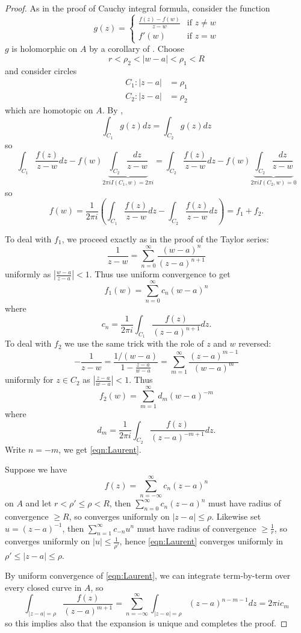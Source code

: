 \documentclass[a4paper]{article}
\begin{document}
\begin{proof}
  As in the proof of Cauchy integral formula, consider the function
  \[
    g(z) =
    \begin{cases}
      \frac{f(z) - f(w)}{z - w} & \text{if } z \neq w \\
      f'(w) & \text{if } z = w
    \end{cases}
  \]
  \(g\) is holomorphic on \(A\) by a corollary of . Choose
  \[
    r < \rho_2 < |w - a| < \rho_1 < R
  \]
  and consider circles
  \begin{align*}
    C_1: |z - a| &= \rho_1 \\
    C_2: |z - a| &= \rho_2
  \end{align*}
  which are homotopic on \(A\). By ,
  \[
    \int_{C_1} g(z) dz = \int_{C_2} g(z) dz
  \]
  so
  \[
    \int_{C_1} \frac{f(z)}{z - w} dz - f(w) \underbrace{\int_{C_2} \frac{dz}{z - w}}_{2\pi i I(C_1, w) = 2\pi i}
    = \int_{C_2} \frac{f(z)}{z - w} dz - f(w) \underbrace{\int_{C_2} \frac{dz}{z - w}}_{2\pi i I(C_2, w) = 0}
  \]
  so
  \[
    f(w)
    = \frac{1}{2\pi i} \left( \int_{C_1} \frac{f(z)}{z - w} dz - \int_{C_2} \frac{f(z)}{z - w} dz \right)
    = f_1 + f_2.
  \]

  To deal with \(f_1\), we proceed exactly as in the proof of the Taylor series:
  \[
    \frac{1}{z - w}
    = \sum_{n = 0}^\infty \frac{(w - a)^n}{(z - a)^{n + 1}}
  \]
  uniformly as \(\left| \frac{w - a}{z - a} \right| < 1\). Thus use uniform convergence to get
  \[
    f_1(w) = \sum_{n = 0}^\infty c_n(w - a)^n
  \]
  where
  \[
    c_n = \frac{1}{2\pi i} \int_{C_1} \frac{f(z)}{(z - a)^{n + 1}} dz.
  \]
  To deal with \(f_2\) we use the same trick with the role of \(z\) and \(w\) reversed:
  \[
    -\frac{1}{z - w}
    = \frac{1/(w - a)}{1 - \frac{z - a}{w - a}}
    = \sum_{m = 1}^\infty \frac{(z - a)^{m - 1}}{(w - a)^m}
  \]
  uniformly for \(z \in C_2\) as \(\left| \frac{z - a}{w - a} \right| < 1\). Thus
  \[
    f_2(w) = \sum_{m = 1}^\infty d_m (w - a)^{-m}
  \]
  where
  \[
    d_m = \frac{1}{2\pi i} \int_{C_2} \frac{f(z)}{(z - a)^{-m + 1}} dz.
  \]
  Write \(n = -m\), we get \eqref{eqn:Laurent}.

  Suppose we have
  \[
    f(z) = \sum_{n = -\infty}^\infty c_n(z - a)^n
  \]
  on \(A\) and let \(r < \rho' \leq \rho < R\), then \(\sum_{n = 0}^\infty c_n(z - a)^n\) must have radius of convergence \(\geq R\), so converges uniformly on \(|z - a| \leq \rho\). Likewise set \(u = (z - a)^{-1}\), then \(\sum_{n = 1}^\infty c_{-n}u^n\) must have radius of convergence \(\geq \frac{1}{r}\), so converges uniformly on \(|u| \leq \frac{1}{\rho'}\), hence \eqref{eqn:Laurent} converges uniformly in \(\rho' \leq |z - a| \leq \rho\).

  By uniform convergence of \eqref{eqn:Laurent}, we can integrate term-by-term over every closed curve in \(A\), so
  \[
    \int_{|z - a| = \rho} \frac{f(z)}{(z - a)^{m + 1}}
    = \sum_{n = -\infty}^\infty \int_{|z - a| = \rho} (z - a)^{n - m - 1} dz
    = 2\pi i c_m
  \]
  so this implies also that the expansion is unique and completes the proof.
\end{proof}
\end{document}
